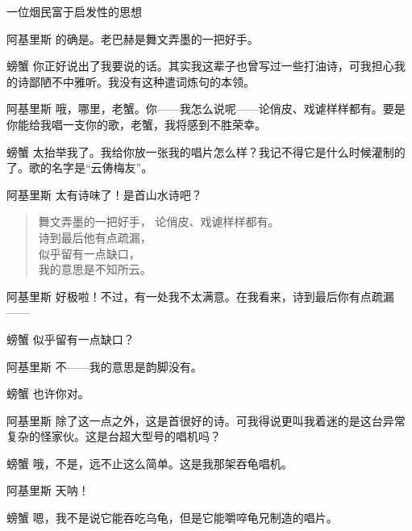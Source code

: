 \begin{dialog}{一位烟民富于启发性的思想}
\begin{dialogue}
\item[阿基里斯]的确是。老巴赫是舞文弄墨的一把好手。

\item[螃蟹]你正好说出了我要说的话。其实我这辈子也曾写过一些打油诗，可我担心我的诗鄙陋不中雅听。我没有这种遣词炼句的本领。

\item[阿基里斯]哦，哪里，老蟹。你——我怎么说呢——论俏皮、戏谑样样都有。要是你能给我唱一支你的歌，老蟹，我将感到不胜荣幸。

\item[螃蟹]太抬举我了。我给你放一张我的唱片怎么样？我记不得它是什么时候灌制的了。歌的名字是“云俦梅友”。

\item[阿基里斯]太有诗味了！是首山水诗吧？


\begin{verse}
舞文弄墨的一把好手，
论俏皮、戏谑样样都有。\\
诗到最后他有点疏漏，\\
似乎留有一点缺口，\\
我的意思是不知所云。
\end{verse}

\item[阿基里斯]好极啦！不过，有一处我不太满意。在我看来，诗到最后你有点疏漏——

\item[螃蟹]似乎留有一点缺口？

\item[阿基里斯]不——我的意思是韵脚没有。

\item[螃蟹]也许你对。

\item[阿基里斯]除了这一点之外，这是首很好的诗。可我得说更叫我着迷的是这台异常复杂的怪家伙。这是台超大型号的唱机吗？

\item[螃蟹]哦，不是，远不止这么简单。这是我那架吞龟唱机。

\item[阿基里斯]天呐！

\item[螃蟹]嗯，我不是说它能吞吃乌龟，但是它能嚼啐龟兄制造的唱片。


\end{dialogue}
\end{dialog}
